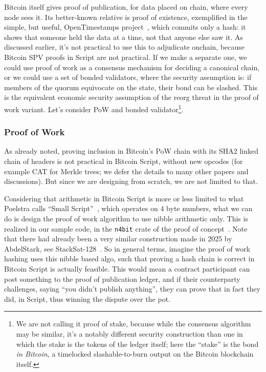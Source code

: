 \documentclass[11pt]{article}
\begin{document}
Bitcoin itself gives proof of publication, for data placed on chain, where every node sees it. Its better-known relative is proof of existence, exemplified in the simple, but useful, OpenTimestamps project~\cite{ots}, which commits only a hash: it shows that someone held the data at a time, not that anyone else saw it. As discussed earlier, it's not practical to use this to adjudicate onchain, because Bitcoin SPV proofs in Script are not practical. If we make a separate one, we could use proof of work as a consensus mechanism for deciding a canonical chain, or we could use a set of bonded validators, where the security assumption is: if members of the quorum equivocate on the state, their bond can be slashed. This is the equivalent economic security assumption of the reorg threat in the proof of work variant. Let's consider PoW and bonded validator\footnote{We are not calling it proof of stake, because while the consensus algorithm may be similar, it's a notably different security construction than one in which the stake is the tokens of the ledger itself; here the ``stake'' is the bond \emph{in Bitcoin}, a timelocked slashable-to-burn output on the Bitcoin blockchain itself.}.

\subsubsection{Proof of Work}

As already noted, proving inclusion in Bitcoin's PoW chain with its SHA2 linked chain of headers is not practical in Bitcoin Script, without new opcodes (for example CAT for Merkle trees; we defer the details to many other papers and discussions). But since we are designing from scratch, we are not limited to that.

Considering that arithmetic in Bitcoin Script is more or less limited to what Poelstra calls ``Small Script''~\cite{poelstrastate}, which operates on 4 byte numbers, what we can do is design the proof of work algorithm to use nibble arithmetic only. This is realized in our sample code, in the \texttt{n4bit} crate of the proof of concept~\cite{lngapcode}. Note that there had already been a very similar construction made in 2025 by AbdelStark, see StackSat-128~\cite{stacksat}. So in general terms, imagine the proof of work hashing uses this nibble based algo, such that proving a hash chain is correct in Bitcoin Script is actually feasible. This would mean a contract participant can post something to the proof of publication ledger, and if their counterparty challenges, saying ``you didn't publish anything'', they can prove that in fact they did, in Script, thus winning the dispute over the pot.
\end{document}
